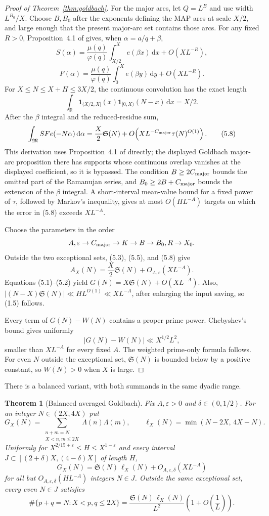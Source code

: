 \documentclass[11pt]{article}
\newtheorem{theorem}{Theorem}[section]
\theoremstyle{remark}
\newcommand{\M}{\mathfrak M}
\newcommand{\Sg}{\mathfrak S}
\newcommand{\eps}{\varepsilon}
\newcommand{\1}{\mathbf 1}
\newcommand{\dd}{\,\mathrm d}
\begin{document}
\begin{proof}[Proof of Theorem~\ref{thm:goldbach}]
For the major arcs, let $Q=L^B$ and use width
$L^{B_0}/X$.  Choose $B,B_0$ after the exponents defining the MAP arcs at
scale $X/2$, and large enough that the present major-arc set contains those
arcs.  For any fixed \(R>0\), Proposition~4.1 of \cite{MRT2019}
gives, when $\alpha=a/q+\beta$,
\[
 S(\alpha)=\frac{\mu(q)}{\varphi(q)}\int_{X/2}^{X}e(\beta x)\dd x+O(XL^{-R}),
\]
\[
 F(\alpha)=\frac{\mu(q)}{\varphi(q)}\int_0^{X}e(\beta y)\dd y+O(XL^{-R}).
\]
For $X\le N\le X+H\le3X/2$, the continuous convolution has the exact length
\[
 \int_{\mathbb R}\1_{(X/2,X]}(x)\1_{[0,X)}(N-x)\dd x=X/2. \tag{5.7}
\]
After the $\beta$ integral and the reduced-residue sum,
\[
 \int_\M SF e(-N\alpha)\dd\alpha
 =\frac X2\Sg(N)+O\!\left(XL^{-C_{\rm major}}\tau(N)^{O(1)}\right). \tag{5.8}
\]
This derivation uses Proposition~4.1 of \cite{MRT2019} directly; the
displayed Goldbach major-arc proposition there has supports whose continuous
overlap vanishes at the displayed coefficient, so it is bypassed.
The condition $B\ge2C_{\rm major}$ bounds the omitted part of the Ramanujan
series, and $B_0\ge2B+C_{\rm major}$ bounds the extension of the \(\beta\)
integral.  A short-interval mean-value bound for a fixed power of \(\tau\),
followed by Markov's inequality, gives at most
$O(HL^{-A})$ targets on which the error in (5.8) exceeds $XL^{-A}$.

Choose the parameters in the order
\[
 A,\eps\to C_{\rm major}\to K\to B\to B_0,R\to X_0.
\]
Outside the two exceptional sets, (5.3), (5.5), and (5.8) give
\[
 A_X(N)=\frac X2\Sg(N)+O_{A,\eps}(XL^{-A}).
\]
Equations (5.1)--(5.2) yield $G(N)=X\Sg(N)+O(XL^{-A})$.
Also,
$|(N-X)\Sg(N)|\ll H L^{O(1)}\ll XL^{-A}$, after enlarging the input saving,
so (1.5) follows.

Every term of $G(N)-W(N)$ contains a proper prime power.  Chebyshev's bound
gives uniformly
\[
 |G(N)-W(N)|\ll X^{1/2}L^2,
\]
smaller than $XL^{-A}$ for every fixed $A$.  The weighted prime-only formula
follows.  For even \(N\) outside the exceptional set, \(\Sg(N)\) is
bounded below by a positive constant, so $W(N)>0$ when $X$ is large.
\end{proof}

There is a balanced variant, with both summands in the same dyadic range.

\begin{theorem}[Balanced averaged Goldbach]\label{thm:balanced}
Fix $A,\eps>0$ and $\delta\in(0,1/2)$.  For an integer $N\in(2X,4X)$ put
\[
 G_X(N)=\sum_{\substack{n+m=N\\X<n,m\le2X}}\Lambda(n)\Lambda(m),
 \qquad
 \ell_X(N)=\min(N-2X,\,4X-N).
\]
Uniformly for $X^{2/15+\eps}\le H\le X^{1-\eps}$ and every interval
$J\subset[(2+\delta)X,(4-\delta)X]$ of length $H$,
\[
 G_X(N)=\Sg(N)\,\ell_X(N)+O_{A,\eps,\delta}(XL^{-A})
 \tag{5.9}
\]
for all but $O_{A,\eps,\delta}(HL^{-A})$ integers $N\in J$.  Outside the
same exceptional set, every even $N\in J$ satisfies
\[
 \#\{p+q=N:X<p,q\le2X\}
 =\frac{\Sg(N)\,\ell_X(N)}{L^2}\left(1+O\!\left(\frac1L\right)\right).
\]
\end{theorem}
\end{document}
